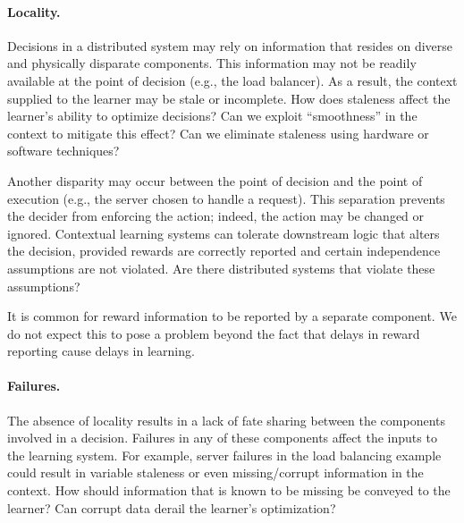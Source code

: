\documentclass[letterpaper,twocolumn]{article}
\newcommand{\ignore}[1]{}
\begin{document}
\paragraph{Locality.}
Decisions in a distributed system may rely on information that resides on
diverse and physically disparate components. This information may not be readily
available at the point of decision (e.g., the load balancer).
As a result, the context supplied to the learner may be stale or
incomplete.  How does staleness affect the learner's ability to optimize
decisions? Can we exploit ``smoothness'' in the context to mitigate this effect?
Can we eliminate staleness using hardware or software techniques?

Another disparity may occur between the point of decision and the
point of execution (e.g., the server chosen to handle a request).  This
separation prevents the decider from enforcing the action; indeed, the action
may be changed or ignored.  Contextual learning systems can tolerate
downstream logic that alters the decision, provided rewards are
correctly reported and certain independence assumptions are not
violated.  Are there distributed systems that violate these assumptions?

It is common for reward information to be reported by a separate
component. We do not expect this to pose a problem beyond the fact that delays 
in reward reporting cause delays in learning.

\ignore{typically reported separately by a asynchronously While reward
information is also not available at the decision location, this is the norm in contextual learning
settings, where reward information is only discernible after a delay and often
by a separate subsystem. Thus, we do not expect this to pose a problem. (The faster reward information is collected, the
faster the resulting data point can be used by the learning subsystem.)
}

\paragraph{Failures.}
The absence of locality results in a lack of fate sharing
between the components involved in a decision.  Failures in any of
these components affect the inputs to the learning system.
For example, server failures in the load balancing example could
result in variable staleness or even missing/corrupt information in
the context.  How should information that is known to be missing 
be conveyed to the learner?  Can corrupt data derail the learner's optimization? 
\end{document}
